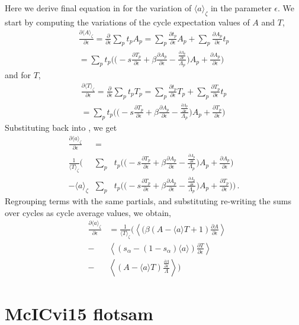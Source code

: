 \documentclass[aps,pre,
                showpacs,
                twocolumn,
                groupedaddress,
                floatfix]{revtex4-1}
\begin{document}
Here we derive final equation in  for the
variation of $\langle a\rangle_{\zeta}$ in the parameter $\epsilon$. We
start by computing the variations of the cycle expectation values of $A$
and $T$,
\begin{eqnarray*}
\frac{\partial \langle A \rangle_{\zeta}}{\partial \epsilon} = \frac{\partial}{\partial \epsilon}\sum_{p}t_{p}A_{p} = \sum_{p}\frac{\partial t_{p}}{\partial \epsilon}A_{p} + \sum_{p} \frac{\partial A_{p}}{\partial \epsilon} t_{p}
\\ = \sum_{p}t_{p}\Bigg( \Bigg( -s\frac{\partial T_{p}}{\partial \epsilon} + \beta \frac{\partial A_{p}}{\partial \epsilon} - \frac{\frac{\partial \Lambda_{p}}{\partial \epsilon}}{\Lambda_{p}}\Bigg) A_{p} +\frac{\partial A_{p}}{\partial \epsilon} \Bigg)
\end{eqnarray*}
and for $T$,
\begin{eqnarray*}
\frac{\partial \langle T \rangle_{\zeta}}{\partial \epsilon} = \frac{\partial}{\partial \epsilon}\sum_{p}t_{p}T_{p} = \sum_{p}\frac{\partial t_{p}}{\partial \epsilon}T_{p} + \sum_{p} \frac{\partial T_{p}}{\partial \epsilon} t_{p}
\\ = \sum_{p}t_{p}\Bigg( \Bigg( -s\frac{\partial T_{p}}{\partial \epsilon} + \beta \frac{\partial A_{p}}{\partial \epsilon} - \frac{\frac{\partial \Lambda_{p}}{\partial \epsilon}}{\Lambda_{p}}\Bigg) A_{p} +\frac{\partial T_{p}}{\partial \epsilon} \Bigg)
\end{eqnarray*}
Substituting back into , we get
\begin{eqnarray*}
\frac{\partial \langle a \rangle_{\zeta}}{\partial \epsilon} &=&
\\ \frac{1}{\langle T\rangle_{\zeta}}\Bigg( &\sum_{p}&t_{p}\Bigg( \Bigg( -s\frac{\partial T_{p}}{\partial \epsilon} + \beta \frac{\partial A_{p}}{\partial \epsilon} - \frac{\frac{\partial \Lambda_{p}}{\partial \epsilon}}{\Lambda_{p}}\Bigg) A_{p} +\frac{\partial A_{p}}{\partial \epsilon} \Bigg)
\\ - \langle a \rangle_{\zeta} &\sum_{p}&t_{p}\Bigg( \Bigg( -s\frac{\partial T_{p}}{\partial \epsilon} + \beta \frac{\partial A_{p}}{\partial \epsilon} - \frac{\frac{\partial \Lambda_{p}}{\partial \epsilon}}{\Lambda_{p}}\Bigg) A_{p} +\frac{\partial T_{p}}{\partial \epsilon} \Bigg) \Bigg)
\,.
\end{eqnarray*}
Regrouping terms with the same partials, and substituting re-writing the
sums  over cycles as cycle average values, we obtain,
\begin{eqnarray*}
&\frac{\partial \langle a\rangle_{\zeta}}{\partial \epsilon}& = \frac{1}{\langle T \rangle_{\zeta}}\Bigg( \left\langle (\beta(A-\langle a\rangle T + 1)\frac{\partial A}{\partial \epsilon}\right\rangle \\ &-& \left\langle (s_{\alpha}-(1-s_{\alpha})\langle a\rangle)\frac{\partial T}{\partial \epsilon}\right\rangle  \\
&-&\left\langle (A-\langle a \rangle T) \frac{\frac{\partial \Lambda}{\partial \epsilon}}{\Lambda}\right\rangle \Bigg)
\end{eqnarray*}

\ifboyscout
\newpage
    \section{McICvi15 flotsam}
    \label{s:flotsam}
    
\newpage
\fi


\end{document}
